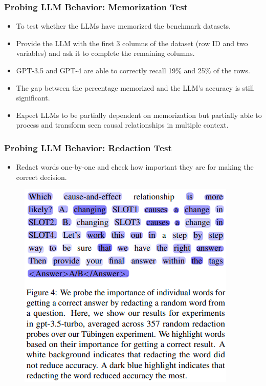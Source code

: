 \documentclass{beamer}
\begin{document}
\begin{frame}
	\frametitle{Probing LLM Behavior: Memorization Test}
	\begin{itemize}
		\item To test whether the LLMs have memorized the benchmark datasets.
		\item Provide the LLM with the first 3 columns of the dataset (row ID and two variables) and 
			ask it to complete the remaining columns.
		\item GPT-3.5 and GPT-4 are able to correctly recall 19\% and 25\% of the rows. 
		\item The gap between the percentage memorized and the LLM's accuracy is still significant.
		\item Expect LLMs to be partially dependent on memorization but partially able to process and transform
			seen causal relationships in multiple context.
	\end{itemize}
\end{frame}

\begin{frame}
	\frametitle{Probing LLM Behavior: Redaction Test}
	\begin{itemize}
		\item Redact words one-by-one and check how important they are for making the correct decision.
	\end{itemize}
	\begin{figure}
		\centering
		\includegraphics[scale=0.4]{imgs/figure4.png}
	\end{figure}
\end{frame}
\end{document}
